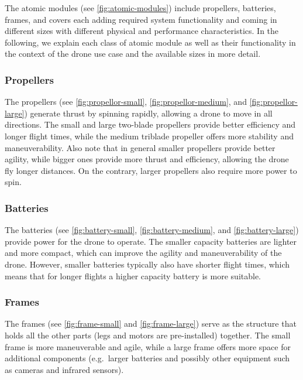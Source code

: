 \documentclass[sigconf,review]{acmart}
\begin{document}
The atomic modules (see \cref{fig:atomic-modules}) include propellers, batteries, frames, and covers each adding required system functionality and coming in different sizes with different physical and performance characteristics.
In the following, we explain each class of atomic module as well as their functionality in the context of the drone use case and the available sizes in more detail.

\subsubsection*{Propellers}
\label{sec:propellers}

The propellers (see \cref{fig:propellor-small}, \cref{fig:propellor-medium}, and \cref{fig:propellor-large}) generate thrust by spinning rapidly, allowing a drone to move in all directions. 
The small and large two-blade propellers provide better efficiency and longer flight times, while the medium triblade propeller offers more stability and maneuverability. 
Also note that in general smaller propellers provide better agility, while bigger ones provide more thrust and efficiency, allowing the drone fly longer distances.
On the contrary, larger propellers also require more power to spin.

\subsubsection*{Batteries}
\label{sec:batteries}

The batteries (see \cref{fig:battery-small}, \cref{fig:battery-medium}, and \cref{fig:battery-large}) provide power for the drone to operate. 
The smaller capacity batteries are lighter and more compact, which can improve the agility and maneuverability of the drone. 
However, smaller batteries typically also have shorter flight times, which means that for longer flights a higher capacity battery is more suitable.

\subsubsection*{Frames}
\label{sec:frames}

The frames (see \cref{fig:frame-small} and \cref{fig:frame-large}) serve as the structure that holds all the other parts (legs and motors are pre-installed) together. 
The small frame is more maneuverable and agile, while a large frame offers more space for additional components (e.g.~larger batteries and possibly other equipment such as cameras and infrared sensors).
\end{document}
